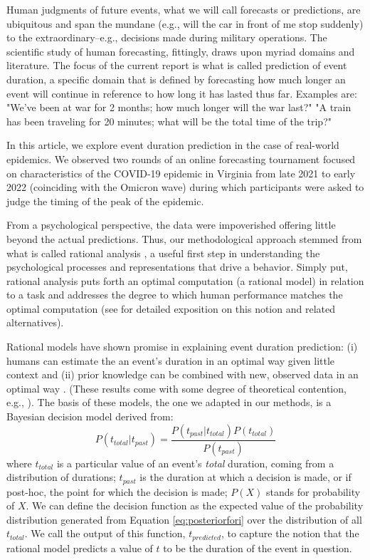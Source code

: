 Human judgments of future events, what we will call forecasts or predictions, are ubiquitous and span the mundane (e.g., will the car in front of me stop suddenly) to the extraordinary--e.g., decisions made during military operations. The scientific study of human forecasting, fittingly, draws upon myriad domains and literature. The focus of the current report is what is called prediction of event duration, a specific domain that is defined by forecasting how much longer an event will continue in reference to how long it has lasted thus far.  Examples are:   "We've been at war for 2 months; how much longer will the war last?"  "A train has been traveling for 20 minutes; what will be the total time of the trip?"
 
In this article, we explore event duration prediction in the case of real-world epidemics.   We observed two rounds of an online forecasting tournament focused on characteristics of the COVID-19 epidemic in Virginia from late 2021 to early 2022 (coinciding with the Omicron wave) during which participants were asked to judge the timing of the peak of the epidemic.  

From a psychological perspective, the data were impoverished offering little beyond the actual predictions.  Thus, our methodological approach stemmed from what is called rational analysis \citep{anderson2013adaptive, Lieder2020, marr2010vision}, a useful first step in understanding the psychological processes and representations that drive a behavior.  Simply put, rational analysis puts forth an optimal computation (a rational model) in relation to a task and addresses the degree to which human performance matches the optimal computation (see \cite{Tauber2017} for detailed exposition on this notion and related alternatives).  

Rational models have shown promise in explaining event duration prediction:  (i) humans can estimate the an event's duration in an optimal way given little context and (ii) prior knowledge can be combined with new, observed data in an optimal way \citep{GriffithsTenenbaum2006,GriffithsTenenbaum2011,Tauber2017}.  (These results come with some degree of theoretical contention, e.g., \cite{MozerPashlerHomaei2008}).  The basis of these models, the one we adapted in our methods, is a Bayesian decision model derived from: 
\begin{equation}\label{eq:posteriorfori}
    P(t_{total} \vert t_{past}) = \frac{P(t_{past} \vert t_{total}) P(t_{total})} {P(t_{past})}
\end{equation}
where $t_{total}$ is a particular value of an event's \textit{total} duration, coming from a distribution of durations; $t_{past}$ is the duration at which a decision is made, or if post-hoc, the point for which the decision is made; $P(X)$ stands for probability of $X$.  We can define the decision function as the expected value of the probability distribution generated from Equation \ref{eq:posteriorfori} over the distribution of all $t_{total}$. We call the output of this function, $t_{predicted}$, to capture the notion that the rational model predicts a value of $t$ to be the duration of the event in question.  

